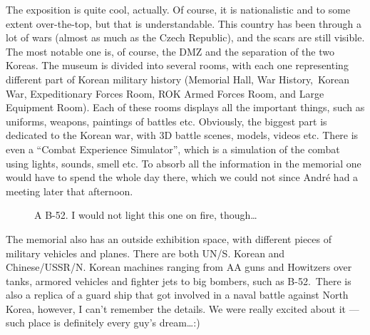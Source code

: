 \begin{post}
\begin{content}
The exposition is quite cool, actually. Of course, it is nationalistic and to some extent over-the-top, but that is understandable. This country has been through a lot of wars (almost as much as the Czech Republic), and the scars are still visible. The most notable one is, of course, the DMZ and the separation of the two Koreas. The museum is divided into several rooms, with each one representing different part of Korean military history (Memorial Hall, War History, Korean War, Expeditionary Forces Room, ROK Armed Forces Room, and Large Equipment Room). Each of these rooms displays all the important things, such as uniforms, weapons, paintings of battles etc. Obviously, the biggest part is dedicated to the Korean war, with 3D battle scenes, models, videos etc. There is even a ``Combat Experience Simulator'', which is a simulation of the combat using lights, sounds, smell etc. To absorb all the information in the memorial one would have to spend the whole day there, which we could not since André had a meeting later that afternoon.

\begin{figure}[!h]
\centering
{}
\caption{A B-52. I would not light this one on fire, though{\ldots}}
\end{figure}

The memorial also has an outside exhibition space, with different pieces of military vehicles and planes. There are both UN/S. Korean and Chinese/USSR/N. Korean machines ranging from AA guns and Howitzers over tanks, armored vehicles and fighter jets to big bombers, such as B-52. There is also a replica of a guard ship that got involved in a naval battle against North Korea, however, I can't remember the details. We were really excited about it --- such place is definitely every guy's dream{\ldots}:)



\end{content}
\end{post}
